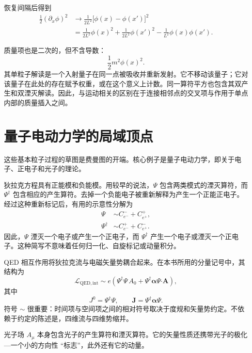 恢复间隔后得到
\begin{align}
\frac12(\partial_x\phi)^2
&\longrightarrow
\frac{1}{2L^2}\bigl[\phi(x)-\phi(x')\bigr]^2
\\
&=
\frac{1}{2L^2}\phi(x)^2
+\frac{1}{2L^2}\phi(x')^2
-\frac{1}{L^2}\phi(x)\phi(x').
\end{align}

质量项也是二次的，但不含导数：
\begin{equation}
\frac12m^2\phi(x)^2.
\end{equation}
其单粒子解读是一个入射量子在同一点被吸收并重新发射。它不移动该量子；它对该量子在此处的存在赋予权重，或在这个意义上计数。同一算符平方也包含其双产生和双湮灭解读。因此，与运动相关的区别在于连接相邻点的交叉项与作用于单点内部的质量插入之间。

\section{量子电动力学的局域顶点}

这些基本粒子过程的草图是费曼图的开端。核心例子是量子电动力学，即关于电子、正电子和光子的理论。

狄拉克方程具有正能模和负能模。用较早的说法，\(\Psi\) 包含两类模式的湮灭算符，而 \(\Psi^\dagger\) 包含相应的产生算符。去掉一个负能电子被重新解释为产生一个正能正电子。经过这种重新标记后，有用的示意性分解为
\begin{align}
\Psi
&\sim
C^-_{e^-}+C^+_{e^+},
\\
\Psi^\dagger
&\sim
C^+_{e^-}+C^-_{e^+}.
\end{align}
因此，\(\Psi\) 湮灭一个电子或产生一个正电子，而 \(\Psi^\dagger\) 产生一个电子或湮灭一个正电子。这种简写不意味着任何归一化、自旋标记或动量积分。

QED 相互作用将狄拉克流与电磁矢量势耦合起来。在本书所用的分量记号中，其结构为
\begin{equation}
\mathcal L_{\mathrm{QED,int}}
\sim
e\left(
\Psi^\dagger\Psi\,A_0
+
\Psi^\dagger\boldsymbol{\alpha}\Psi\mathbin{\boldsymbol{\cdot}}\mathbf A
\right),
\end{equation}
其中
\begin{equation}
J^0=\Psi^\dagger\Psi,
\qquad
\mathbf J=\Psi^\dagger\boldsymbol{\alpha}\Psi.
\end{equation}
符号 \(\sim\) 很重要：时间项与空间项之间的相对符号取决于度规和矢量势约定。不依赖于约定的陈述是，四维流与四维势缩并。

光子场 \(A_\mu\) 本身包含光子的产生算符和湮灭算符。它的矢量性质还携带光子的极化---一个小的方向性 ``标志''，此外还有它的动量。

